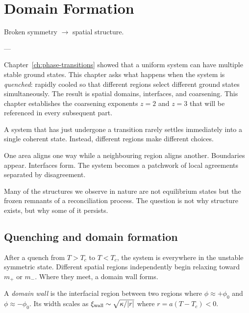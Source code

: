 
\chapter{Domain Formation}
\label{ch:domain-formation}

\epigraph{%
  Broken symmetry $\rightarrow$ spatial structure.%
}{---}

\begin{WhyChapter}
  Chapter~\ref{ch:phase-transitions} showed that a uniform
  system can have multiple stable ground states.
  This chapter asks what happens when the system is \emph{quenched}:
  rapidly cooled so that different regions select different
  ground states simultaneously.
  The result is spatial domains, interfaces, and coarsening.
  This chapter establishes the coarsening exponents $z = 2$
  and $z = 3$ that will be referenced in every subsequent part.
\end{WhyChapter}


\begin{ChapterIntro}
A system that has just undergone a transition rarely settles immediately into a single coherent state. Instead, different regions make different choices.

One area aligns one way while a neighbouring region aligns another. Boundaries appear. Interfaces form. The system becomes a patchwork of local agreements separated by disagreement.

Many of the structures we observe in nature are not equilibrium states but the frozen remnants of a reconciliation process. The question is not why structure exists, but why some of it persists.
\end{ChapterIntro}

\section{Quenching and domain formation}

After a quench from $T > T_c$ to $T < T_c$, the system
is everywhere in the unstable symmetric state.
Different spatial regions independently begin relaxing toward
$m_+$ or $m_-$.
Where they meet, a domain wall forms.

\begin{definition}
  A \emph{domain wall} is the interfacial region between two
  regions where $\phi \approx +\phi_0$ and $\phi \approx -\phi_0$.
  Its width scales as $\xi_{\rm wall} \sim \sqrt{\kappa/|r|}$
  where $r = a(T-T_c) < 0$.
\end{definition}


